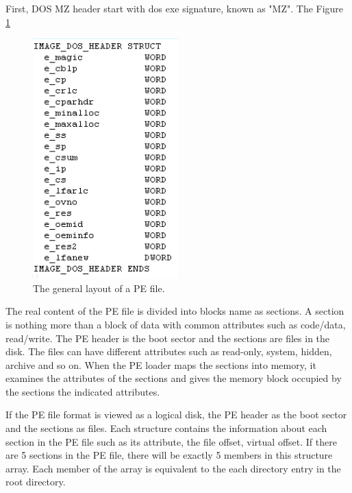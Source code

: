 First, DOS MZ header start with dos exe signature, known as "MZ". The Figure \ref{fig:dosheader} 	
\begin{figure}[h!]
\centering
\includegraphics[width=0.5\textwidth]{graph/dosHeaderStructure.png}
\caption{The general layout of a PE file.}
\label{fig:dosheader}
\end{figure}
The real content of the PE file is divided into blocks name as sections. A section is nothing more than a block of data with common attributes such as code/data, read/write. The PE header is the boot sector and the sections are files in the disk. The files can have different attributes such as read-only, system, hidden, archive and so on. When the PE loader maps the sections into memory, it examines the attributes of the sections and gives the memory block occupied by the sections the indicated attributes.

If the PE file format is viewed as a logical disk, the PE header as the boot sector and the sections as files. Each structure contains the information about each section in the PE file such as its attribute, the file offset, virtual offset. If there are 5 sections in the PE file, there will be exactly 5 members in this structure array. Each member of the array is equivalent to the each directory entry in the root directory.

